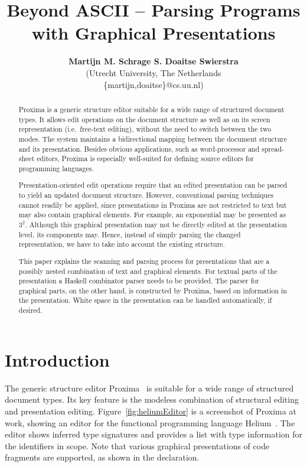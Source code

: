 \documentclass{article}[10pt]
\title{Beyond ASCII -- Parsing Programs with Graphical Presentations}
\author{{\bfseries Martijn M. Schrage S. Doaitse Swierstra}\\
   (Utrecht University, The Netherlands\\
   \{martijn,doaitse\}@cs.uu.nl)\\
}
\begin{document}
 

\maketitle

\begin{abstract}

Proxima is a generic structure editor suitable for a wide range of structured document types. It allows edit operations on the document structure as well as on its screen representation (i.e.\ free-text editing), without the need to switch between the two modes. The system maintains a bidirectional mapping between the document structure and its presentation. Besides obvious applications, such as word-processor and spread-sheet editors, Proxima is especially well-suited for defining source editors for programming languages.

Presentation-oriented edit operations require that an edited presentation can be parsed to yield an updated document structure. However, conventional parsing techniques cannot readily be applied, since presentations in Proxima are not restricted to text but may also contain graphical elements. For example, an exponential may be presented as $3^2$. Although this graphical presentation may not be directly edited at the presentation level, its components may. Hence, instead of simply parsing the changed representation, we have to take into account the existing structure. 

This paper explains the scanning and parsing process for presentations that are a possibly nested combination of text and graphical elements. For textual parts of the presentation a Haskell combinator parser needs to be provided. The parser for graphical parts, on the other hand, is constructed by Proxima, based on information in the presentation. White space in the presentation can be handled automatically, if desired. 
\end{abstract}


\section{Introduction}\label{sect:introduction}

The generic structure editor Proxima~\cite{schrage04Proxima} is suitable for a wide range of structured document types. Its key feature is the modeless combination of structural editing and presentation editing. Figure~\ref{fig:heliumEditor} is a screenshot of Proxima at work, showing an editor for the functional programming language Helium~\cite{heeren03helium}. The editor shows inferred type signatures and provides a list with type information for the identifiers in scope. Note that various graphical presentations of code fragments are supported, as shown in the declaration.
\end{document}
